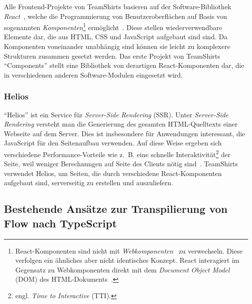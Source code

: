 Alle Frontend-Projekte von TeamShirts basieren auf der Software-Bibliothek \textit{React}~\autocite{SOFTWARE:REACT}, welche die Programmierung von Benutzeroberflächen auf Basis von sogenannten \emph{Komponenten}\footnote{React-Komponenten sind nicht mit \textit{Webkomponenten}~\autocite{MDN:WEBCOMPONENTS} zu verwechseln. Diese verfolgen ein ähnliches aber nicht identisches Konzept. React interagiert im Gegensatz zu Webkomponenten direkt mit dem \textit{Document Object Model} (DOM) des HTML-Dokuments~\autocite{REACT:WEBCOMPONENTS}.} ermöglicht~\autocite{ACM:REACT}. Diese stellen wiederverwendbare Elemente dar, die aus HTML, CSS und JavaScript aufgebaut sind sind. Da Komponenten voneinander unabhängig sind können sie leicht zu komplexere Strukturen zusammen gesetzt werden. Das erste Projekt von TeamShirts \enquote{Components} stellt eine Bibliothek von derartigen React-Komponenten dar, die in verschiedenen anderen Software-Modulen eingesetzt wird.

\subsubsection{Helios}

\enquote{Helios} ist ein Service für \emph{Server-Side Rendering} (SSR). Unter \emph{Server-Side Rendering} versteht man die Generierung des gesamten HTML-Quelltexts einer Webseite auf dem Server. Dies ist insbesondere für Anwendungen interessant, die JavaScript für den Seitenaufbau verwenden. Auf diese Weise ergeben sich verschiedene Performance-Vorteile wie z.~B. eine schnelle Interaktivität\footnote{engl. \emph{Time to Interactive} (TTI).} der Seite, weil weniger Berechnungen auf Seite des Clients nötig sind~\autocite{GOOGLE:RENDERING_ON_THE_WEB}. TeamShirts verwendet Helios, um Seiten, die durch verschiedene React-Komponenten aufgebaut sind, serverseitig zu erstellen und auszuliefern.

\subsection{Bestehende Ansätze zur Transpilierung von Flow nach TypeScript}

